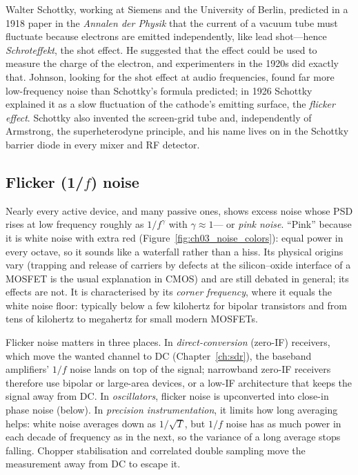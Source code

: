 
\begin{history}
Walter Schottky, working at Siemens and the University of Berlin, predicted in a 1918 paper in the
\emph{Annalen der Physik} that the current of a vacuum tube must fluctuate because electrons are emitted
independently, like lead shot---hence \emph{Schroteffekt}, the shot effect. He suggested that the effect
could be used to measure the charge of the electron, and experimenters in the 1920s did exactly that.
Johnson, looking for the shot effect at audio frequencies, found far more low-frequency noise than
Schottky's formula predicted; in 1926 Schottky explained it as a slow fluctuation of the cathode's
emitting surface, the \emph{flicker effect}. Schottky also invented the screen-grid tube and,
independently of Armstrong, the superheterodyne principle, and his name lives on in the Schottky barrier
diode in every mixer and RF detector.
\end{history}

\subsection{Flicker (1/$f$) noise}

Nearly every active device, and many passive ones, shows excess noise whose PSD rises at low frequency
roughly as $1/f^\gamma$ with $\gamma\approx1$--- or \emph{pink noise}. ``Pink''
because it is white noise with extra red (Figure~\ref{fig:ch03_noise_colors}): equal power in every
octave, so it sounds like a waterfall rather than a hiss. Its physical origins vary (trapping and release
of carriers by defects at the silicon--oxide interface of a MOSFET is the usual explanation in CMOS) and
are still debated in general; its effects are not. It is characterised by its \emph{corner frequency},
where it equals the white noise floor: typically below a few kilohertz for bipolar transistors and from
tens of kilohertz to megahertz for small modern MOSFETs.

Flicker noise matters in three places. In \emph{direct-conversion} (zero-IF) receivers, which move the
wanted channel to DC (Chapter~\ref{ch:sdr}), the baseband amplifiers' $1/f$ noise lands on top of the
signal; narrowband zero-IF receivers therefore use bipolar or large-area devices, or a low-IF
architecture that keeps the signal away from DC. In \emph{oscillators}, flicker noise is upconverted into
close-in phase noise (below). In \emph{precision instrumentation}, it limits how long averaging helps:
white noise averages down as $1/\sqrt{T}$, but $1/f$ noise has as much power in each decade of frequency
as in the next, so the variance of a long average stops falling. Chopper stabilisation and correlated
double sampling move the measurement away from DC to escape it.

